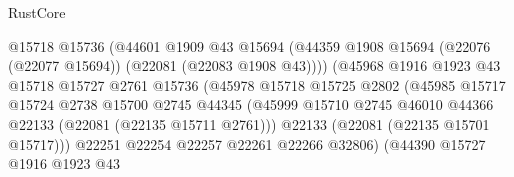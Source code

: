 \begin{lexlean}{RustCore}
\begin{coremodule}
                                        @15718
                                        @15736
                                        (@44601
                                          @1909
                                          @43
                                          @15694
                                          (@44359
                                            @1908
                                            @15694
                                            (@22076 (@22077 @15694))
                                            (@22081 (@22083 @1908 @43))))
                                        (@45968
                                          @1916
                                          @1923
                                          @43
                                          @15718
                                          @15727
                                          @2761
                                          @15736
                                          (@45978
                                            @15718
                                            @15725
                                            @2802
                                            (@45985
                                              @15717
                                              @15724
                                              @2738
                                              @15700
                                              @2745
                                              @44345
                                              (@45999
                                                @15710
                                                @2745
                                                @46010
                                                @44366
                                                @22133
                                                (@22081 (@22135 @15711 @2761)))
                                              @22133
                                              (@22081 (@22135 @15701 @15717)))
                                            @22251
                                            @22254
                                            @22257
                                            @22261
                                            @22266
                                            @32806)
                                          (@44390
                                            @15727
                                            @1916
                                            @1923
                                            @43

\end{coremodule}
\end{lexlean}
